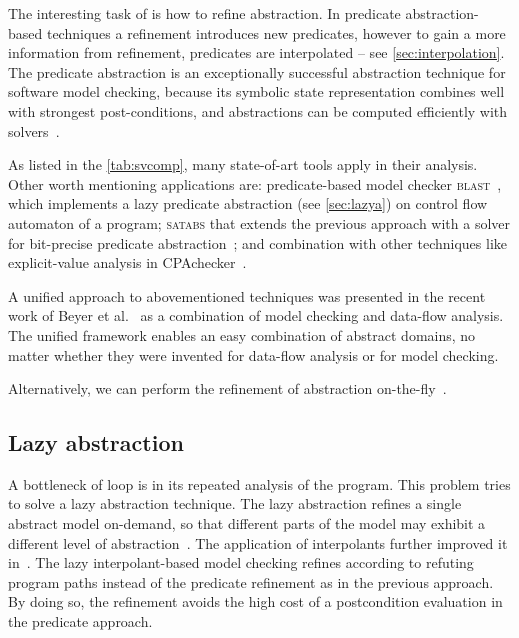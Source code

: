 The interesting task of \cegar is how to refine abstraction. In predicate
abstraction-based techniques a refinement introduces new predicates, however to
gain a more information from refinement, predicates are interpolated
\cite{Jhala2006} -- see \autoref{sec:interpolation}. The predicate abstraction
is an exceptionally successful abstraction technique for software model
checking, because its symbolic state representation combines well with
strongest post-conditions, and abstractions can be computed efficiently with
\smt solvers~\cite{Beyer2013}.

As listed in the \autoref{tab:svcomp}, many state-of-art tools apply \cegar in
their analysis. Other worth mentioning applications are: predicate-based model
checker \textsc{blast}~\cite{Henzinger2003, Beyer2005checking}, which
implements a lazy predicate abstraction (see \autoref{sec:lazya}) on control
flow automaton of a program; \textsc{satabs} that extends the previous approach
with a \sat solver for bit-precise predicate abstraction~\cite{Clarke2005satabs};
and combination with other techniques like explicit-value analysis in
CPAchecker~\cite{Beyer2013, Beyer2018e}.

A unified approach to abovementioned techniques was presented in the recent
work of Beyer et al.~\cite{Beyer2018b} as a combination of model checking and
data-flow analysis. The unified framework enables an easy combination of
abstract domains, no matter whether they were invented for data-flow analysis
or for model checking.

Alternatively, we can perform the refinement of abstraction
on-the-fly~\cite{Beyer2008program}.

\subsection{Lazy abstraction}
\label{sec:lazya}

A bottleneck of \cegar loop is in its repeated analysis of the program. This
problem tries to solve a lazy abstraction technique. The lazy abstraction
refines a single abstract model on-demand, so that different parts of the model
may exhibit a different level of abstraction~\cite{Henzinger2002}. The application of
interpolants further improved it in~\cite{McMillan2006}. The lazy
interpolant-based model checking refines according to refuting program paths
instead of the predicate refinement as in the previous approach. By doing so,
the refinement avoids the high cost of a postcondition evaluation in the
predicate approach.

